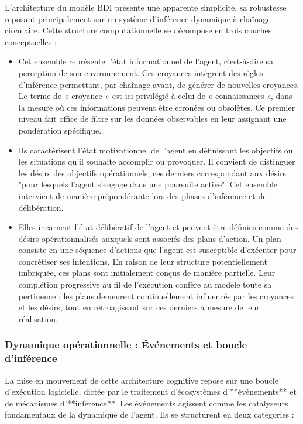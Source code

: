 \documentclass{article}
\begin{document}
L'architecture du modèle BDI présente une apparente simplicité, sa robustesse reposant principalement sur un système d'inférence dynamique à chaînage circulaire. Cette structure computationnelle se décompose en trois couches conceptuelles :

\begin{itemize}
    \item[\textbf{Beliefs (Croyances) :}] Cet ensemble représente l'état informationnel de l'agent, c'est-à-dire sa perception de son environnement. Ces croyances intègrent des règles d'inférence permettant, par chaînage avant, de générer de nouvelles croyances. Le terme de « croyance » est ici privilégié à celui de « connaissances », dans la mesure où ces informations peuvent être erronées ou obsolètes. Ce premier niveau fait office de filtre sur les données observables en leur assignant une pondération spécifique.
    
    \item[\textbf{Desires (Désirs) :}] Ils caractérisent l'état motivationnel de l'agent en définissant les objectifs ou les situations qu'il souhaite accomplir ou provoquer. Il convient de distinguer les désirs des objectifs opérationnels, ces derniers correspondant aux désirs "pour lesquels l'agent s'engage dans une poursuite active". Cet ensemble intervient de manière prépondérante lors des phases d'inférence et de délibération.
    
    \item[\textbf{Intentions (Intentions) :}] Elles incarnent l'état délibératif de l'agent et peuvent être définies comme des désirs opérationnalisés auxquels sont associés des plans d'action. Un plan consiste en une séquence d'actions que l'agent est susceptible d'exécuter pour concrétiser ses intentions. En raison de leur structure potentiellement imbriquée, ces plans sont initialement conçus de manière partielle. Leur complétion progressive au fil de l'exécution confère au modèle toute sa pertinence : les plans demeurent continuellement influencés par les croyances et les désirs, tout en rétroagissant sur ces derniers à mesure de leur réalisation.
\end{itemize}
\subsubsection{Dynamique opérationnelle : Événements et boucle d'inférence}

La mise en mouvement de cette architecture cognitive repose sur une boucle d'exécution logicielle, dictée par le traitement d'écosystèmes d'**événements** et de mécanismes d'**inférence**. Les événements agissent comme les catalyseurs fondamentaux de la dynamique de l'agent. Ils se structurent en deux catégories :
\end{document}
